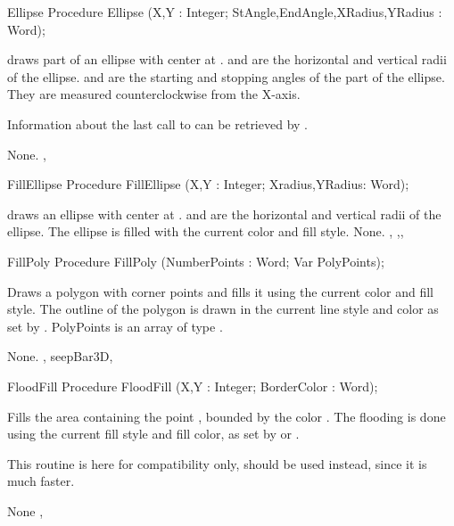 \begin{procedure}{Ellipse}
\Declaration
Procedure Ellipse (X,Y : Integer; StAngle,EndAngle,XRadius,YRadius : Word);

\Description
  draws part of an ellipse with center at .
 and  are the horizontal and vertical radii of the
ellipse.  and  are the starting and stopping angles of
the part of the ellipse. They are measured counterclockwise from the X-axis.

Information about the last call to  can be retrieved by
.

\Errors
None.
\SeeAlso
{} , 
\end{procedure}
\begin{procedure}{FillEllipse}
\Declaration
Procedure FillEllipse (X,Y : Integer; Xradius,YRadius: Word);

\Description
  draws an ellipse with center at .
 and  are the horizontal and vertical radii of the
ellipse. The ellipse is filled with the current color and fill style.
\Errors
None.
\SeeAlso
{} ,
,, 
\end{procedure}

\begin{procedure}{FillPoly}
\Declaration
Procedure FillPoly (NumberPoints : Word; Var PolyPoints);

\Description

Draws a polygon with  corner points and fills it
using the current color and fill style. The outline of the polygon
is drawn in the current line style and color as set by .
PolyPoints is an array of type .

\Errors
None.
\SeeAlso
{}, seep{Bar3D}, 
\end{procedure}
\begin{procedure}{FloodFill}
\Declaration
Procedure FloodFill (X,Y : Integer; BorderColor : Word);

\Description

Fills the area containing the point , bounded by the color
. The flooding is done using the current fill style
and fill color, as set by  or .

This routine is here for compatibility only,  should be
used instead, since it is much faster.

\Errors
None
\SeeAlso
{},
\end{procedure}

